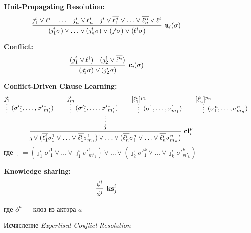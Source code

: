 \begin{figure}\begin{calculus}\centering

\textbf{Unit-Propagating Resolution:}
$$
\infer[\upr{i}{\sigma}]
	  {(\jmath_1^i \sigma) \vee \ldots \vee (\jmath_n^i \sigma) \vee 
       (\jmath^i \sigma) \vee (\ell^i \sigma)}
      {\jmath_1^i \vee \ell^i_1 & \ldots & 
       \jmath_n^i \vee \ell^i_n & 
       \jmath^i \vee 
       \overline{\ell'^i_1} \vee \ldots \vee \overline{\ell'^i_n} \vee \ell^i
      }
$$

\bigskip

\textbf{Conflict:}
$$
\infer[\confl{i}{\sigma}]
      {(\jmath_1^i \sigma) \vee (\jmath_2^i \sigma)}
      {(\jmath_1^i \vee \ell^i) & (\jmath_2^i \vee \overline{\ell'^i})}
$$ 

\bigskip

\textbf{Conflict-Driven Clause Learning:} 
$$
\infer[\cdcl{i}{p}]
      { \jmath \vee (\overline{\ell^i_1} \sigma^1_1 \vee \ldots \vee \overline{\ell^i_1} \sigma^1_{m_1}) \vee \ldots \vee (\overline{\ell^i_n} \sigma^n_1 \vee \ldots \vee \overline{\ell^i_n} \sigma^n_{m_n})
      }
	  { \infer*{\jmath}
               { \infer*[({\sigma'}_1^1,\ldots,{\sigma'}_{m'_1}^1)]
                      {}{\jmath^i_1} &  &
                 \infer*[({\sigma'}_1^1,\ldots,{\sigma'}_{m'_1}^1)]
                      {}{\jmath^i_m} &  &
                 \infer*[(\sigma_1^1,\ldots,\sigma_{m_1}^1)]
                      {}{[\ell^i_1]^{\dls{p}{1} } } &  &
                 \infer*[(\sigma_1^n,\ldots,\sigma_{m_n}^n)]
                      {}{[\ell^i_n]^{\dls{p}{n}}}
               }
      }
$$ 
где $\jmath = ({\jmath^i_1} \sigma'^1_1 \vee \ldots \vee \jmath^i_1 \sigma'^1_{m'_1}) \vee \ldots \vee ({\jmath^i_k} \sigma'^k_1 \vee \ldots \vee \jmath^i_k\sigma'^k_{m'_k})$

\bigskip

\textbf{Knowledge sharing:} 
$$
\infer[\kshare{i}{j}]
      {\phi^j}
	  {\phi^i}
$$

где $\phi^a$ --- клоз из актора $a$

\end{calculus}

\caption{Исчисление \emph{Expertised Conflict Resolution}}

\label{fig:ECR}
\end{figure}

